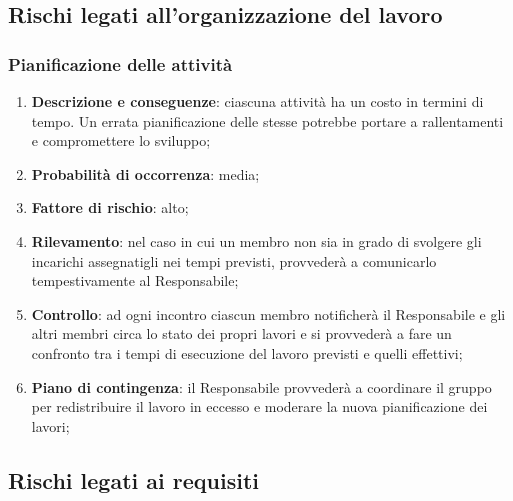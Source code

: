 \subsection{Rischi legati all'organizzazione del lavoro}
	\subsubsection{Pianificazione delle attività}
	\begin{enumerate}
		\item \textbf{Descrizione e conseguenze}: ciascuna attività ha un costo in termini di tempo. Un errata pianificazione delle stesse potrebbe portare a rallentamenti e compromettere lo sviluppo; 
		\item \textbf{Probabilità di occorrenza}: media;
		\item \textbf{Fattore di rischio}: alto;
		\item \textbf{Rilevamento}: nel caso in cui un membro non sia in grado di svolgere gli incarichi assegnatigli nei tempi previsti, provvederà a comunicarlo tempestivamente al Responsabile;		
		\item \textbf{Controllo}: ad ogni incontro ciascun membro notificherà il Responsabile e gli altri membri circa lo stato dei propri lavori e si provvederà a fare un confronto tra i tempi di esecuzione del lavoro previsti e quelli effettivi; 
		\item \textbf{Piano di contingenza}: il Responsabile provvederà a coordinare il gruppo per redistribuire il lavoro in eccesso e moderare la nuova pianificazione dei lavori;
	\end{enumerate}
	
\subsection{Rischi legati ai requisiti}
